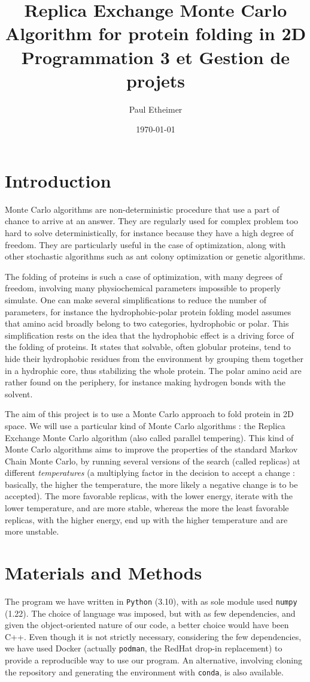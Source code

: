 \documentclass[a4paper, 12pt]{article}
\author{Paul Etheimer}
\date{\today}
\title{Replica Exchange Monte Carlo Algorithm for protein folding in 2D\\\medskip
\large Programmation 3 et Gestion de projets}
\begin{document}
\maketitle
\section*{Introduction}
\label{sec:orga5f84ee}
Monte Carlo algorithms are non-deterministic procedure that use a part of chance to arrive at an answer. They are regularly used for complex problem too hard to solve deterministically, for instance because they have a high degree of freedom. They are particularly useful in the case of optimization, along with other stochastic algorithms such as ant colony optimization or genetic algorithms.


The folding of proteins is such a case of optimization, with many degrees of freedom, involving many physiochemical parameters impossible to properly simulate. One can make several simplifications to reduce the number of parameters, for instance the hydrophobic-polar protein folding model assumes that amino acid broadly belong to two categories, hydrophobic or polar. This simplification rests on the idea that the hydrophobic effect is a driving force of the folding of proteins. It states that solvable, often globular proteins, tend to hide their hydrophobic residues from the environment by grouping them together in a hydrophic core, thus stabilizing the whole protein. The polar amino acid are rather found on the periphery, for instance making hydrogen bonds with the solvent.

The aim of this project is to use a Monte Carlo approach to fold protein in 2D space. We will use a particular kind of Monte Carlo algorithms : the Replica Exchange Monte Carlo algorithm (also called parallel tempering). This kind of Monte Carlo algorithms aims to improve the properties of the standard Markov Chain Monte Carlo, by running several versions of the search (called replicas) at different \emph{temperatures} (a multiplying factor in the decision to accept a change : basically, the higher the temperature, the more likely a negative change is to be accepted). The more favorable replicas, with the lower energy, iterate with the lower temperature, and are more stable, whereas the more the least favorable replicas, with the higher energy, end up with the higher temperature and are more unstable.
\section*{Materials and Methods}
\label{sec:org1d93d46}
The program we have written in \texttt{Python} (3.10), with as sole module used \texttt{numpy} (1.22). The choice of language was imposed, but with as few dependencies, and given the object-oriented nature of our code, a better choice would have been C++. Even though it is not strictly necessary, considering the few dependencies, we have used Docker (actually \texttt{podman}, the RedHat drop-in replacement) to provide a reproducible way to use our program. An alternative, involving cloning the repository and generating the environment with \texttt{conda}, is also available.
\end{document}
